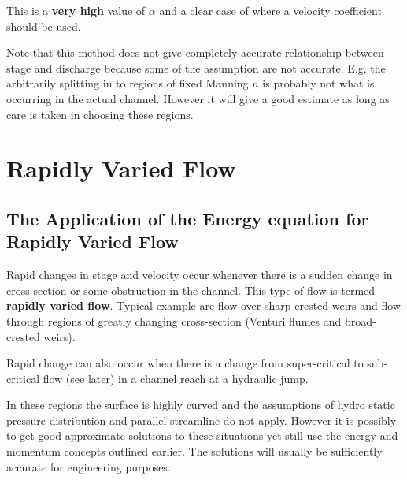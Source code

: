 \documentclass[a4paper, 12pt, british]{article} %
\numberwithin{equation}{section}
\numberwithin{figure}{section}
\numberwithin{table}{section}
\begin{document}
This is a \textbf{very high} value of $\alpha$ and a clear case of where a velocity coefficient should be used.

Note that this method does not give completely accurate relationship between stage and discharge because some of the assumption are not accurate. E.g. the arbitrarily splitting in to regions of fixed Manning $n$ is probably not what is occurring in the actual channel. However it will give a good estimate as long as care is taken in choosing these regions.



\newpage
\section{Rapidly Varied Flow}
\subsection{The Application of the Energy equation for Rapidly Varied Flow}

Rapid changes in stage and velocity occur whenever there is a sudden change in cross-section or some obstruction in the channel. This type of flow is termed \textbf{rapidly varied flow}. Typical example are flow over sharp-crested weirs and flow through regions of greatly changing cross-section (Venturi flumes and broad-crested weirs).

Rapid change can also occur when there is a change from super-critical to sub-critical flow (see later) in a channel reach at a hydraulic jump.

In these regions the surface is highly curved and the assumptions of hydro static pressure distribution and parallel streamline do not apply. However it is possibly to get good approximate solutions to these situations yet still use the energy and momentum concepts outlined earlier. The solutions will usually be sufficiently accurate for engineering purposes.
\end{document}
